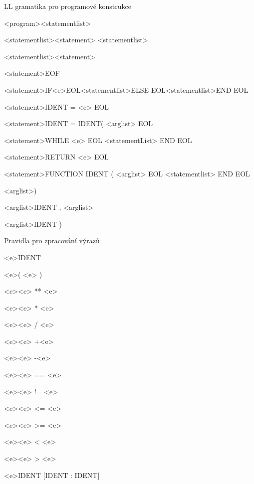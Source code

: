 \documentclass{beamer}
\begin{document}
\begin{frame}{LL gramatika pro programové konstrukce}
  \begin{enumerate}
  {\footnotesize
  \item {<program>\textrightarrow<statementlist>}
  \item {<statementlist>\textrightarrow<statement> <statementlist>}
  \item {<statementlist>\textrightarrow<statement>}
  \item {<statement>\textrightarrow EOF}
  \item {<statement>\textrightarrow IF<e>EOL<statementlist>ELSE EOL<statementlist>END EOL}
  \item {<statement>\textrightarrow IDENT = <e> EOL}
  \item {<statement>\textrightarrow IDENT = IDENT( <arglist> EOL}
  \item {<statement>\textrightarrow WHILE <e> EOL <statementList> END EOL}
  \item {<statement>\textrightarrow RETURN <e> EOL}
  \item {<statement>\textrightarrow FUNCTION IDENT ( <arglist> EOL <statementlist> END EOL}
  \item {<arglist>\textrightarrow )}
  \item {<arglist>\textrightarrow IDENT , <arglist>}
  \item {<arglist>\textrightarrow IDENT )}
  }
  \end{enumerate}
\end{frame}

\begin{frame}{Pravidla pro zpracování výrazů}
  \begin{enumerate}
  {\footnotesize
  \item {<e>\textrightarrow IDENT}
  \item {<e>\textrightarrow ( <e> )}
  \item {<e>\textrightarrow <e> ** <e>}
  \item {<e>\textrightarrow <e> * <e>}
  \item {<e>\textrightarrow <e> / <e>}
  \item {<e>\textrightarrow <e> +<e>}
  \item {<e>\textrightarrow <e> -<e>}
  \item {<e>\textrightarrow <e> == <e>}
  \item {<e>\textrightarrow <e> != <e>}
  \item {<e>\textrightarrow <e> <= <e>}
  \item {<e>\textrightarrow <e> >= <e>}
  \item {<e>\textrightarrow <e> < <e>}
  \item {<e>\textrightarrow <e> > <e>}
  \item {<e>\textrightarrow IDENT [IDENT : IDENT]}
  }
  \end{enumerate}
\end{frame}
\end{document}
